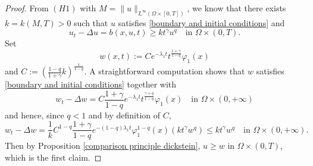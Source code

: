 \documentclass[11pt, reqno]{amsart}
\theoremstyle{definition}
\numberwithin{equation}{section}
\def\norm#1{\|#1\|}
\begin{document}
\begin{proof}
From \hyperlink{H1}{\( (H1) \)} with $M=\norm{u}_{L^{\infty}(\Omega \times [0,T])}$, we know that there exists $k=k(M, T)>0$ such that $u$ satisfies \eqref{boundary and initial conditions} and 
$$u_t-\Delta u=b(x,u,t)\geq k t^{\gamma} u^q \quad \text{in }\Omega\times (0, T).$$
Set 
$$w(x,t):= C e^{-\lambda_1 t} t^{\frac{1+\gamma}{1-q}} \varphi_1(x)$$
and $C := (\frac{1-q}{1+\gamma} k)^{\frac{1}{1-q}} 
$. 
A straightforward computation shows that $w$ satisfies \eqref{boundary and initial conditions} 
together with
$$w_t-\Delta w = C \frac{1+\gamma}{1-q} e^{-\lambda_1 t} t^{\frac{\gamma+q}{1-q}} \varphi_1(x) \quad \text{in }\Omega\times (0,+\infty)$$
and hence, since $q <1$ and by definition of $C$, 
$$w_t-\Delta w = 
\frac{1}{k} C^{1-q} \frac{1+\gamma}{1-q} e^{-(1-q) \lambda_1 t} \varphi_1^{1-q}(x) (k t^{\gamma} w^q) \leq k t^{\gamma} w^q \quad \text{in }\Omega\times (0,+\infty).$$
Then by Proposition \ref{comparison principle dickstein}, $u\geq w$ in $\Omega\times (0,T)$, which is the first claim.

\medskip


\end{proof}
\end{document}
